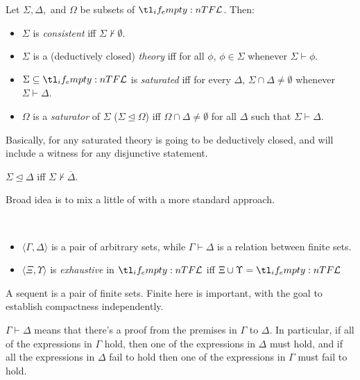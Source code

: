 \documentclass[10pt]{article}
\begin{document}
\begin{definition}
  Let \(\Sigma, \Delta,\) and \(\Omega\) be subsets of \(\olang{}\). Then:
  \begin{itemize}
  \item \(\Sigma\) is \emph{consistent} iff \(\Sigma \nvdash \emptyset\).
  \item \(\Sigma\) is a (deductively closed) \emph{theory} iff for all \(\phi\), \(\phi \in \Sigma\) whenever \(\Sigma \vdash \phi\).
  \item \(\Sigma \subseteq \olang{}\) is \emph{saturated} iff for every \(\Delta\), \(\Sigma \cap \Delta \ne \emptyset\) whenever \(\Sigma \vdash \Delta\).
  \item \(\Omega\) is a \emph{saturator} of \(\Sigma\) (\(\Sigma \unlhd \Omega\)) iff \(\Omega \cap \Delta \ne \emptyset\) for all \(\Delta\) such that \(\Sigma \vdash \Delta\).
  \end{itemize}
\end{definition}
Basically, for any saturated theory is going to be deductively closed, and will include a witness for any disjunctive statement.

\begin{fact}
  \(\Sigma \unlhd \Delta\) iff \(\Sigma \nvdash \overline{\Delta}\).
\end{fact}



\newpage

Broad idea is to mix a little of \citeauthor{Blamey:2002aa} with a more standard approach.

\begin{definition}\mbox{ }
  \begin{itemize}
  \item \(\langle \Gamma,\Delta \rangle\) is a pair of arbitrary sets, while \(\Gamma \vdash \Delta\) is a relation between finite sets.
  \item \(\langle \Xi,\Upsilon \rangle\) is \emph{exhaustive} in \(\olang{}\) iff \(\Xi \cup \Upsilon = \olang{}\)
  \end{itemize}
\end{definition}

A sequent is a pair of finite sets.
Finite here is important, with the goal to establish compactness independently.

\(\Gamma \vdash \Delta\) means that there's a proof from the premises in \(\Gamma\) to \(\Delta\).
In particular, if all of the expressions in \(\Gamma\) hold, then one of the expressions in \(\Delta\) must hold, and if all the expressions in \(\Delta\) fail to hold then one of the expressions in \(\Gamma\) must fail to hold.
\end{document}
